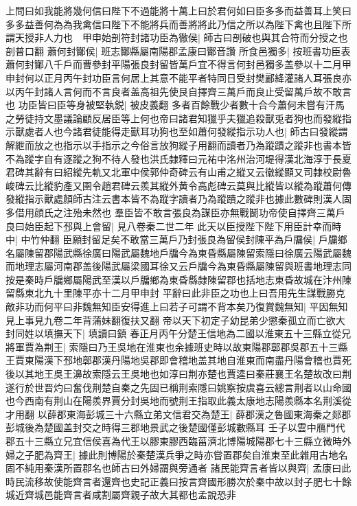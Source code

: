 上問曰如我能將幾何信曰陛下不過能將十萬上曰於君何如曰臣多多而益善耳上笑曰多多益善何為為我禽信曰陛下不能將兵而善將將此乃信之所以為陛下禽也且陛下所謂天授非人力也　甲申始剖符封諸功臣為徹侯|{
	師古曰剖破也與其合符而分授之也剖普口翻}
蕭何封酇侯|{
	班志酇縣屬南陽郡孟康曰酇音讚}
所食邑獨多|{
	按班書功臣表蕭何封酇八千戶而曹參封平陽張良封留皆萬戶宜不得言何封邑獨多盖參以十二月甲申封何以正月丙午封功臣言何居上其意不能平者特同日受封樊酈絳灌諸人耳張良亦以丙午封諸人言何而不言良者盖高祖先使艮自擇齊三萬戶而良止受留萬戶故不敢言也}
功臣皆曰臣等身被堅執鋭|{
	被皮義翻}
多者百餘戰少者數十合今蕭何未嘗有汗馬之勞徒持文墨議論顧反居臣等上何也帝曰諸君知獵乎夫獵追殺獸兎者狗也而發縱指示獸處者人也今諸君徒能得走獸耳功狗也至如蕭何發縱指示功人也|{
	師古曰發縱謂解紲而放之也指示以手指示之今俗言放狗縱子用翻而讀者乃為蹤蹟之蹤非也書本皆不為蹤字自有逐蹤之狗不待人發也洪氏隸釋曰元祐中洺州治河堤得漢北海淳于長夏君碑其辭有曰紹縱先軌又北軍中侯郭仲奇碑云有山甫之縱又云徽縱顯又司隸校尉魯峻碑云比縱豹產又圉令趙君碑云羨其縱外黄令高彪碑云莫與比縱皆以縱為蹤蕭何傳發縱指示獸處顏師古注云書本皆不為蹤字讀者乃為蹤蹟之蹤非也據此數碑則漢人固多借用顔氏之注殆未然也}
羣臣皆不敢言張良為謀臣亦無戰鬭功帝使自擇齊三萬戶良曰始臣起下邳與上會留|{
	見八卷秦二世二年}
此天以臣授陛下陛下用臣計幸而時中|{
	中竹仲翻}
臣願封留足矣不敢當三萬戶乃封張良為留侯封陳平為戶牖侯|{
	戶牖鄉名屬陳留郡陽武縣徐廣曰陽武屬魏地戶牖今為東昏縣屬陳留索隱曰徐廣云陽武屬魏而地理志屬河南郡盖後陽武屬梁國耳徐又云戶牖今為東昏縣屬陳留與班書地理志同按是秦時戶牖鄉屬陽武至漢以戶牖鄉為東昏縣隸陳留郡也括地志東昏故城在汴州陳留縣東北九十里陳平亦十二月甲申封}
平辭曰此非臣之功也上曰吾用先生謀戰勝克敵非功而何平曰非魏無知臣安得進上曰若子可謂不背本矣乃復賞魏無知|{
	平因無知見上事見九卷二年背蒲妹翻復扶又翻}
帝以天下初定子幼昆弟少懲秦孤立而亡欲大封同姓以填撫天下|{
	填讀曰鎮}
春正月丙午分楚王信地為二國以淮東五十三縣立從兄將軍賈為荆王|{
	索隱曰乃王吳地在淮東也余據班史時以故東陽郡鄣郡吳郡五十三縣王賈東陽漢下邳地鄣郡漢丹陽地吳郡即會稽地盖其地自淮東而南盡丹陽會稽也賈死後以其地王吳王濞故索隱云王吳地也如淳曰荆亦楚也賈逵曰秦莊襄王名楚故改曰荆遂行於世晋灼曰奮伐荆楚自秦之先固已稱荆索隱曰姚察按虞喜云總言荆者以山命國也今西南有荆山在陽羨界賈分封吳地而號荆王指取此義太康地志陽羨縣本名荆溪從才用翻}
以薛郡東海彭城三十六縣立弟文信君交為楚王|{
	薛郡漢之魯國東海秦之郯郡彭城後為楚國盖封交之時得三郡地景武之後楚國僅彭城數縣耳}
壬子以雲中鴈門代郡五十三縣立兄宜信侯喜為代王以膠東膠西臨菑濟北博陽城陽郡七十三縣立微時外婦之子肥為齊王|{
	據此則博陽於秦楚漢兵爭之時亦嘗置郡矣自淮東至此雜用古地名固不純用秦漢所置郡名也師古曰外婦謂與旁通者}
諸民能齊言者皆以與齊|{
	孟康曰此時民流移故使能齊言者還齊也史記正義曰按言齊國形勝次於秦中故以封子肥七十餘城近齊城邑能齊言者咸割屬齊親子故大其都也孟說恐非}
